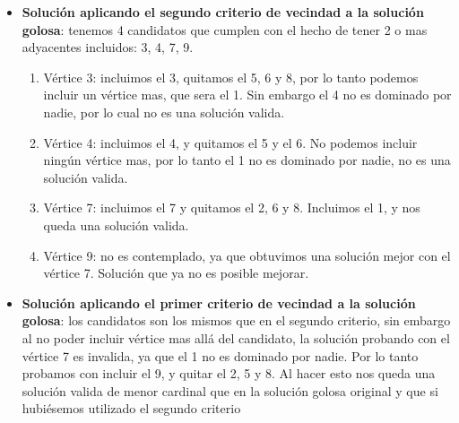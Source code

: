 \begin{itemize}
\item \textbf{Solución aplicando el segundo criterio de vecindad a la solución golosa}: tenemos 4 candidatos que cumplen con el hecho de tener 2 o mas adyacentes incluidos: 3, 4, 7, 9.
\begin{enumerate}
	\item Vértice 3: incluimos el 3, quitamos el 5, 6 y 8, por lo tanto podemos incluir un vértice mas, que sera el 1. Sin embargo el 4 no es dominado por nadie, por lo cual no es una solución valida.
		\item Vértice 4: incluimos el 4, y quitamos el 5 y el 6. No podemos incluir ningún vértice mas, por lo tanto el 1 no es dominado por nadie, no es una solución valida.
		\item Vértice 7: incluimos el 7 y quitamos el 2, 6 y 8. Incluimos el 1, y nos queda una solución valida.
		\item Vértice 9: no es contemplado, ya que obtuvimos una solución mejor con el vértice 7. Solución que ya no es posible mejorar.
\end{enumerate}


\item \textbf{Solución aplicando el primer criterio de vecindad a la solución golosa}: los candidatos son los mismos que en el segundo criterio, sin embargo al no poder incluir vértice mas allá del candidato, la solución probando con el vértice 7 es invalida, ya que el 1 no es dominado por nadie. Por lo tanto probamos con incluir el 9, y quitar el 2, 5 y 8. Al hacer esto nos queda una solución valida de menor cardinal que en la solución golosa original y que si hubiésemos utilizado el segundo criterio


\end{itemize}
